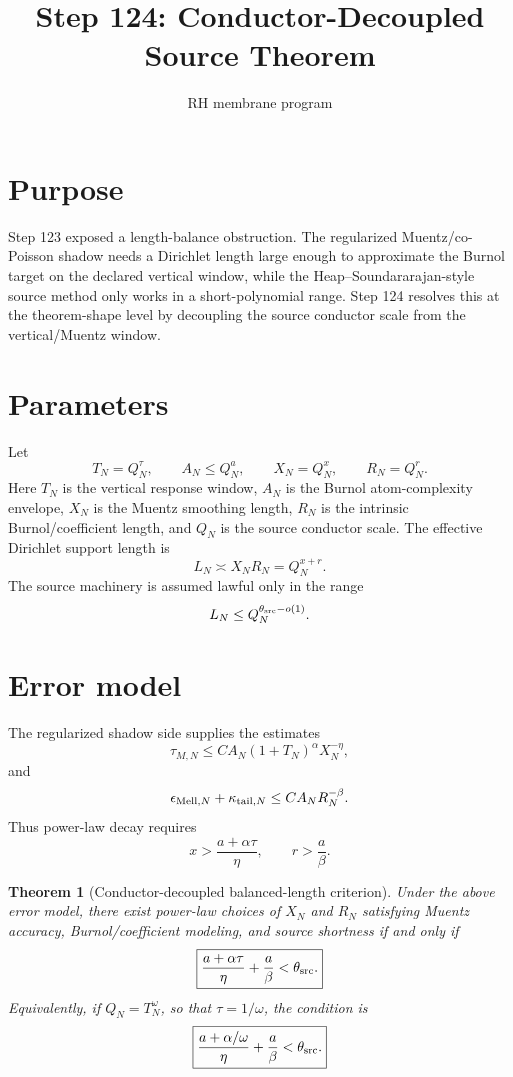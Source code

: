 \documentclass[11pt]{article}
\title{Step 124: Conductor-Decoupled Source Theorem}
\author{RH membrane program}
\date{}
\newtheorem{theorem}{Theorem}
\begin{document}
\maketitle

\section{Purpose}
Step 123 exposed a length-balance obstruction. The regularized Muentz/co-Poisson shadow needs a Dirichlet length large enough to approximate the Burnol target on the declared vertical window, while the Heap--Soundararajan-style source method only works in a short-polynomial range. Step 124 resolves this at the theorem-shape level by decoupling the source conductor scale from the vertical/Muentz window.

\section{Parameters}
Let
\[
T_N=Q_N^\tau,
\qquad
A_N\le Q_N^a,
\qquad
X_N=Q_N^x,
\qquad
R_N=Q_N^r.
\]
Here $T_N$ is the vertical response window, $A_N$ is the Burnol atom-complexity envelope, $X_N$ is the Muentz smoothing length, $R_N$ is the intrinsic Burnol/coefficient length, and $Q_N$ is the source conductor scale. The effective Dirichlet support length is
\[
L_N\asymp X_NR_N=Q_N^{x+r}.
\]
The source machinery is assumed lawful only in the range
\[
L_N\le Q_N^{\theta_{\rm src}-o(1)}.
\]

\section{Error model}
The regularized shadow side supplies the estimates
\[
\tau_{M,N}\le C A_N(1+T_N)^\alpha X_N^{-\eta},
\]
and
\[
\epsilon_{{\rm Mell},N}+\kappa_{{\rm tail},N}\le C A_NR_N^{-\beta}.
\]
Thus power-law decay requires
\[
x>\frac{a+\alpha\tau}{\eta},
\qquad
r>\frac{a}{\beta}.
\]

\begin{theorem}[Conductor-decoupled balanced-length criterion]
Under the above error model, there exist power-law choices of $X_N$ and $R_N$ satisfying Muentz accuracy, Burnol/coefficient modeling, and source shortness if and only if
\[
\boxed{
\frac{a+\alpha\tau}{\eta}+\frac{a}{\beta}<\theta_{\rm src}.
}
\]
Equivalently, if $Q_N=T_N^\omega$, so that $\tau=1/\omega$, the condition is
\[
\boxed{
\frac{a+\alpha/\omega}{\eta}+\frac{a}{\beta}<\theta_{\rm src}.
}
\]
\end{theorem}
\end{document}

